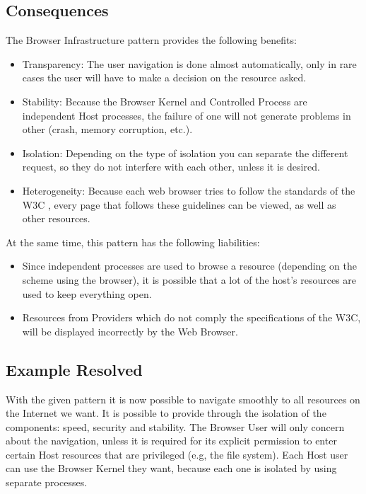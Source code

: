 \documentclass{sig-alternate-05-2015}
\begin{document}
  \subsection*{Consequences}
  The Browser Infrastructure pattern provides the following benefits:
  \begin{itemize}
    \item Transparency: The user navigation is done almost automatically, only in rare cases the user will have to make a decision on the resource asked.
    \item Stability: Because the Browser Kernel and Controlled Process are independent Host processes, the failure of one will not generate problems in other (crash, memory corruption, etc.).
    \item Isolation: Depending on the type of isolation you can separate the different request, so they do not interfere with each other, unless it is desired.
    \item Heterogeneity: Because each web browser tries to follow the standards of the W3C \cite{w3c}, every page that follows these guidelines can be viewed, as well as other resources.
  \end{itemize}
  At the same time, this pattern has the following liabilities:
  \begin{itemize}
    \item Since independent processes are used to browse a resource (depending on the scheme using the browser), it is possible that a lot of the host's resources are used to keep everything open.
    \item Resources from Providers which do not comply the specifications of the W3C, will be displayed incorrectly by the Web Browser.
  \end{itemize}

  \subsection*{Example Resolved}
With the given pattern it is now possible to navigate smoothly to all resources on the Internet we want. It is possible to provide through the isolation of the components: speed, security and stability. The Browser User will only concern about the navigation, unless it is required for its explicit permission to enter certain Host resources that are privileged (e.g, the file system). Each Host user can use the Browser Kernel they want, because each one is isolated by using separate processes.
\end{document}
